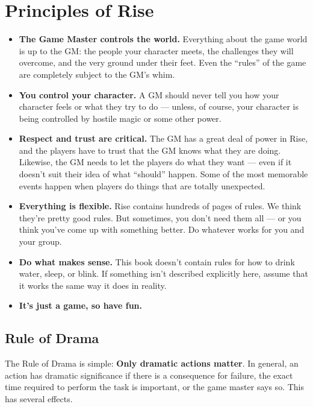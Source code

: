 \section{Principles of Rise}

    \begin{itemize}
        \item \textbf{The Game Master controls the world.} Everything about the game world is up to the GM\@: the people your character meets, the challenges they will overcome, and the very ground under their feet.
            Even the ``rules'' of the game are completely subject to the GM's whim.
        \item \textbf{You control your character.} A GM should never tell you how your character feels or what they try to do --- unless, of course, your character is being controlled by hostile magic or some other power.
        \item \textbf{Respect and trust are critical.} The GM has a great deal of power in Rise, and the players have to trust that the GM knows what they are doing.
            Likewise, the GM needs to let the players do what they want --- even if it doesn't suit their idea of what ``should'' happen.
            Some of the most memorable events happen when players do things that are totally unexpected.
        \item \textbf{Everything is flexible.} Rise contains hundreds of pages of rules.
            We think they're pretty good rules.
            But sometimes, you don't need them all --- or you think you've come up with something better.
            Do whatever works for you and your group.
        \item \textbf{Do what makes sense.} This book doesn't contain rules for how to drink water, sleep, or blink.
            If something isn't described explicitly here, assume that it works the same way it does in reality.
        \item \textbf{It's just a game, so have fun.}
    \end{itemize}

    \subsection{Rule of Drama}

        The Rule of Drama is simple: \textbf{Only dramatic actions matter}.
        In general, an action has dramatic significance if there is a consequence for failure, the exact time required to perform the task is important, or the game master says so.
        This has several effects.

